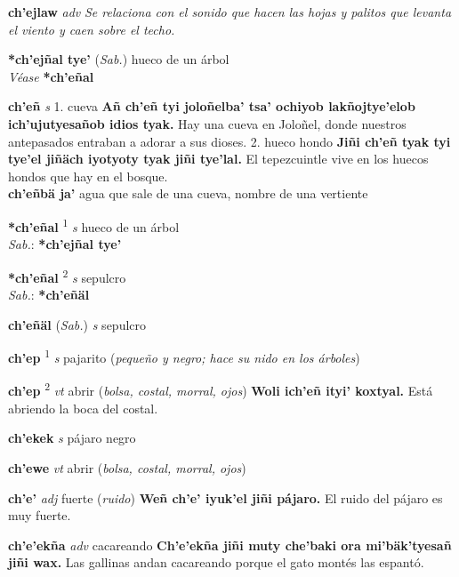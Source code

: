 \documentclass[10pt]{scrbook}
\newcommand{\entry}[1]{\textbf{#1}}
\newcommand{\onedefinition}[1]{#1.}
\newcommand{\defsuperscript}[1]{\textsuperscript{#1}}
\newcommand{\nontranslationdef}[1]{\textit{#1}}
\newcommand{\partofspeech}[1]{\textit{#1}}
\newcommand{\spanishtranslation}[1]{#1}
\newcommand{\clarification}[1]{(\textit{#1})}
\newcommand{\cholexample}[1]{\textbf{#1}}
\newcommand{\exampletranslation}[1]{#1}
\newcommand{\dialectvariant}[1]{\\\textit{#1}:}
\newcommand{\dialectword}[1]{\textbf{#1}}
\newcommand{\alsosee}[1]{\\\textit{Véase} \textbf{#1}}
\newcommand{\relevantdialect}[1]{(\textit{#1})}
\newcommand{\secondaryentry}[1]{\\\textbf{#1}}
\newcommand{\secondtranslation}[1]{#1}
\begin{document}
\begin{multicols}{2}
\entry{ch'ejlaw}
\partofspeech{adv}
\nontranslationdef{Se relaciona con el sonido que hacen las hojas y palitos que levanta el viento y caen sobre el techo.}

\entry{*ch'ejñal tye'}
\relevantdialect{Sab.}
\spanishtranslation{hueco de un árbol}
\alsosee{*ch'eñal}

\entry{ch'eñ}
\partofspeech{s}
\onedefinition{1}
\spanishtranslation{cueva}
\cholexample{Añ ch'eñ tyi joloñelba' tsa' ochiyob lakñojtye'elob ich'ujutyesañob idios tyak.}
\exampletranslation{Hay una cueva en Joloñel, donde nuestros antepasados entraban a adorar a sus dioses.}
\onedefinition{2}
\spanishtranslation{hueco hondo}
\cholexample{Jiñi ch'eñ tyak tyi tye'el jiñäch iyotyoty tyak jiñi tye'lal.}
\exampletranslation{El tepezcuintle vive en los huecos hondos que hay en el bosque.}
\secondaryentry{ch'eñbä ja'}
\secondtranslation{agua que sale de una cueva, nombre de una vertiente}

\entry{*ch'eñal}
\defsuperscript{1}
\partofspeech{s}
\spanishtranslation{hueco de un árbol}
\dialectvariant{Sab.}
\dialectword{*ch'ejñal tye'}

\entry{*ch'eñal}
\defsuperscript{2}
\partofspeech{s}
\spanishtranslation{sepulcro}
\dialectvariant{Sab.}
\dialectword{*ch'eñäl}

\entry{ch'eñäl}
\relevantdialect{Sab.}
\partofspeech{s}
\spanishtranslation{sepulcro}

\entry{ch'ep}
\defsuperscript{1}
\partofspeech{s}
\spanishtranslation{pajarito}
\clarification{pequeño y negro; hace su nido en los árboles}

\entry{ch'ep}
\defsuperscript{2}
\partofspeech{vt}
\spanishtranslation{abrir}
\clarification{bolsa, costal, morral, ojos}
\cholexample{Woli ich'eñ ityi' koxtyal.}
\exampletranslation{Está abriendo la boca del costal.}

\entry{ch'ekek}
\partofspeech{s}
\spanishtranslation{pájaro negro}

\entry{ch'ewe}
\partofspeech{vt}
\spanishtranslation{abrir}
\clarification{bolsa, costal, morral, ojos}

\entry{ch'e'}
\partofspeech{adj}
\spanishtranslation{fuerte}
\clarification{ruido}
\cholexample{Weñ ch'e' iyuk'el jiñi pájaro.}
\exampletranslation{El ruido del pájaro es muy fuerte.}

\entry{ch'e'ekña}
\partofspeech{adv}
\spanishtranslation{cacareando}
\cholexample{Ch'e'ekña jiñi muty che'baki ora mi'bäk'tyesañ jiñi wax.}
\exampletranslation{Las gallinas andan cacareando porque el gato montés las espantó.}


\end{multicols}
\end{document}
